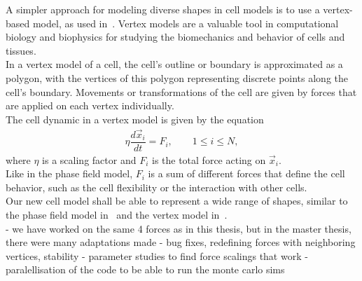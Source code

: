 
A simpler approach for modeling diverse shapes in cell models is to use a vertex-based model, as used in~\cite{Fletcher14}. 
Vertex models are a valuable tool in computational biology and biophysics for studying the biomechanics and behavior of cells and tissues. \\
In a vertex model of a cell, the cell's outline or boundary is approximated as a polygon, with the vertices of this polygon representing discrete points along the cell's boundary. 
Movements or transformations of the cell are given by forces that are applied on each vertex individually. \\
The cell dynamic in a vertex model is given by the equation
\begin{align}
	\eta \dfrac{d \vec{x}_i}{dt} = F_i, \qquad 1 \leq i \leq N \label{eq:vertexmodel}, 
\end{align}
where $\eta$ is a scaling factor and $F_i$ is the total force acting on $\vec{x}_i$. \\
Like in the phase field model, $F_i$ is a sum of different forces that define the cell behavior, such as the cell flexibility or the interaction with other cells. \\
Our new cell model shall be able to represent a wide range of shapes, similar to the phase field model in~\cite{Happel2023} and the vertex model in~\cite{Fletcher14}. \\
- we have worked on the same 4 forces as in this thesis, but in the master thesis, there were many adaptations made 
- bug fixes, redefining forces with neighboring vertices, stability 
- parameter studies to find force scalings that work
- paralellisation of the code to be able to run the monte carlo sims  



